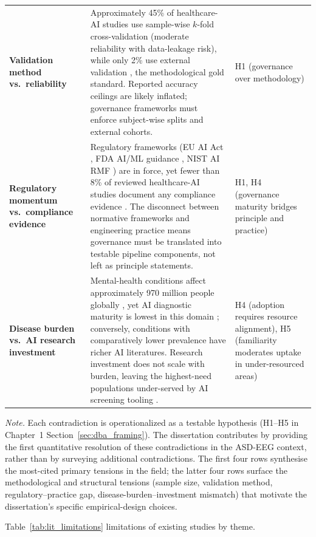 {\begin{xltabular}{\textwidth}{@{} >{\raggedright\arraybackslash}p{2.9cm} p{7.9cm} >{\raggedright\arraybackslash}p{3.5cm} @{}}
\textbf{Validation method vs.\ reliability} & Approximately 45\% of healthcare-AI studies use sample-wise $k$-fold cross-validation (moderate reliability with data-leakage risk), while only 2\% use external validation \cite{rajkomar2019healthcare, esteva2019guide}, the methodological gold standard. Reported accuracy ceilings are likely inflated; governance frameworks must enforce subject-wise splits and external cohorts. & H1 (governance over methodology) \\
\textbf{Regulatory momentum vs.\ compliance evidence} & Regulatory frameworks (EU AI Act \cite{euaiact2024}, FDA AI/ML guidance \cite{fda2024aiml}, NIST AI RMF \cite{nist2023airmf}) are in force, yet fewer than 8\% of reviewed healthcare-AI studies document any compliance evidence \cite{kelly2019healthcare}. The disconnect between normative frameworks and engineering practice means governance must be translated into testable pipeline components, not left as principle statements. & H1, H4 (governance maturity bridges principle and practice) \\
\textbf{Disease burden vs.\ AI research investment} & Mental-health conditions affect approximately 970 million people globally \cite{who2022mental}, yet AI diagnostic maturity is lowest in this domain \cite{topol2019deep}; conversely, conditions with comparatively lower prevalence have richer AI literatures. Research investment does not scale with burden, leaving the highest-need populations under-served by AI screening tooling \cite{who2023asd}. & H4 (adoption requires resource alignment), H5 (familiarity moderates uptake in under-resourced areas) \\
\end{xltabular}}
\vspace{0.4em}
\noindent\textit{Note.} Each contradiction is operationalized as a testable hypothesis (H1--H5 in Chapter~1 Section~\ref{sec:dba_framing}). The dissertation contributes by providing the first quantitative resolution of these contradictions in the ASD-EEG context, rather than by surveying additional contradictions. The first four rows synthesise the most-cited primary tensions in the field; the latter four rows surface the methodological and structural tensions (sample size, validation method, regulatory--practice gap, disease-burden--investment mismatch) that motivate the dissertation's specific empirical-design choices.

\noindent Table~\ref{tab:lit_limitations} limitations of existing studies by theme.

